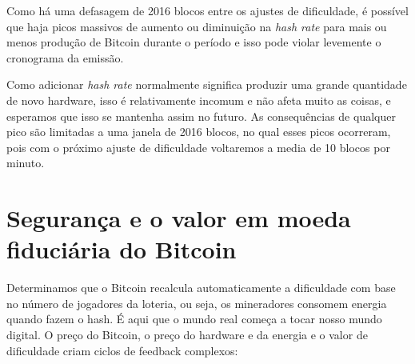 Como há uma defasagem de 2016 blocos entre os ajustes de dificuldade, é possível que haja picos massivos de aumento ou diminuição na \textit{hash rate} para mais ou menos produção de Bitcoin durante o período e isso pode violar levemente o cronograma da emissão.



Como adicionar \textit{hash rate} normalmente significa produzir uma grande quantidade de novo hardware, isso é relativamente incomum e não afeta muito as coisas, e esperamos que isso se mantenha assim no futuro.
As consequências de qualquer pico são limitadas a uma janela de 2016 blocos, no qual esses picos ocorreram, pois com o próximo ajuste de dificuldade voltaremos a media de 10 blocos por minuto.



\section*{Segurança e o valor em moeda fiduciária do Bitcoin}

Determinamos que o Bitcoin recalcula automaticamente a dificuldade com base no número de jogadores da loteria, ou seja, os mineradores consomem energia quando fazem o hash. É aqui que o mundo real começa a tocar nosso mundo digital. O preço do Bitcoin, o preço do hardware e da energia e o valor de dificuldade criam ciclos de feedback complexos:


